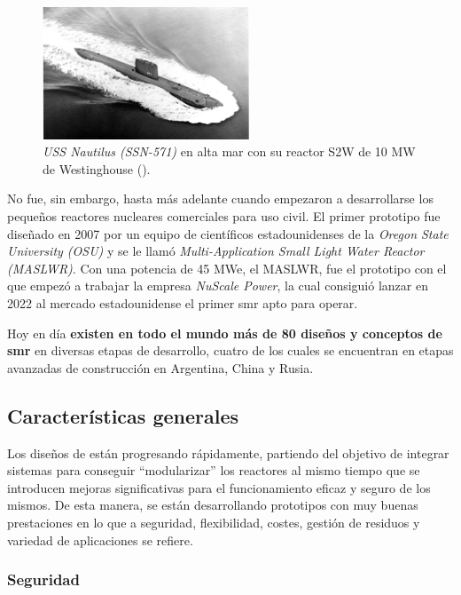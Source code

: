 \begin{figure}[h]
    \centering
    \includegraphics[width=0.55\textwidth]{content/figures/nautilus.jpg}
    \caption{\emph{USS Nautilus (SSN-571)} en alta mar con su reactor S2W de 10 MW de Westinghouse (\cite{poder_naval}).}
    \label{fig:nautilus}
\end{figure}

No fue, sin embargo, hasta más adelante cuando empezaron a desarrollarse los pequeños reactores nucleares comerciales para uso civil. El primer prototipo fue diseñado en 2007 por un equipo de científicos estadounidenses de la \emph{Oregon State University (OSU)} y se le llamó \emph{Multi-Application Small Light Water Reactor (MASLWR)}. Con una potencia de 45 MWe, el MASLWR, fue el prototipo con el que empezó a trabajar la empresa \emph{NuScale Power}, la cual consiguió lanzar en 2022 al mercado estadounidense el primer \acrshort{smr} apto para operar.

Hoy en día \textbf{existen en todo el mundo más de 80 diseños y conceptos de \acrshort{smr}} en diversas etapas de desarrollo, cuatro de los cuales se encuentran en etapas avanzadas de construcción en Argentina, China y Rusia.

\subsection{Características generales}

Los diseños de  están progresando rápidamente, partiendo del objetivo de integrar sistemas para conseguir ``modularizar'' los reactores al mismo tiempo que se introducen mejoras significativas para el funcionamiento eficaz y seguro de los mismos. De esta manera, se están desarrollando prototipos con muy buenas prestaciones en lo que a seguridad, flexibilidad, costes, gestión de residuos y variedad de aplicaciones se refiere.

\subsubsection{Seguridad} \label{seguridad}

